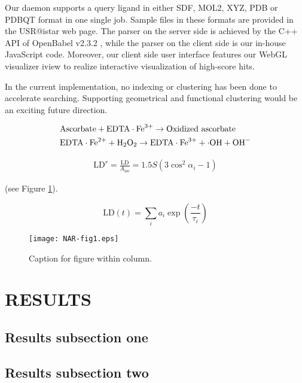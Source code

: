 \documentclass[a4,center,fleqn]{NAR}
\begin{document}
Our daemon supports a query ligand in either SDF, MOL2, XYZ, PDB or PDBQT format in one single job. Sample files in these formats are provided in the USR@istar web page. The parser on the server side is achieved by the C++ API of OpenBabel v2.3.2 \cite{968}, while the parser on the client side is our in-house JavaScript code. Moreover, our client side user interface features our WebGL visualizer iview \cite{1366} to realize interactive visualization of high-score hits.

In the current implementation, no indexing or clustering has been done to accelerate searching. Supporting geometrical and functional clustering would be an exciting future direction.

\begin{align*}
&\mathrm{Ascorbate} + \mathrm{EDTA} \cdot \mathrm{Fe}^{3+} \to
\hbox{Oxidized ascorbate}
\\
&\mathrm{EDTA} \cdot \mathrm{Fe}^{2+} + \mathrm{H}_2
\mathrm{O}_2 \to
\mathrm{EDTA} \cdot \mathrm{Fe}^{3+} + \cdot
\mathrm{OH} + \mathrm{OH}^-
\end{align*}

\begin{align}
\mathrm{LD}^r = \frac{\mathrm{LD}}{A_\mathrm{iso}}
= 1.5 S \left( 3 \cos^2 \alpha_i - 1 \right)
\end{align}

(see Figure \ref{NAR-fig1}).

\begin{equation*}
\mathrm{LD} \left( t \right) =
\sum\limits_i
a_i \exp \left( \frac{-t}{\tau_i} \right)
\end{equation*}

\begin{figure}[t]
\begin{center}
\texttt{[image: NAR-fig1.eps]}
\end{center}
\caption{Caption for figure within column.}
\label{NAR-fig1}
\end{figure}

\section{RESULTS}

\subsection{Results subsection one}

\subsection{Results subsection two}
\end{document}
